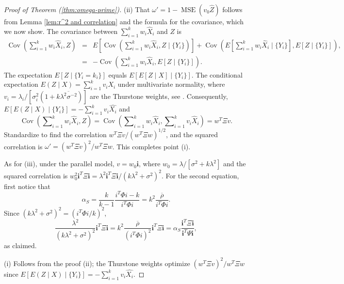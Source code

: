 \documentclass[twoside]{article}
\DeclareMathOperator{\Cov}{Cov}
\DeclareMathOperator{\MSE}{MSE}
\DeclareMathOperator{\tsum}{\textstyle \sum}
\renewcommand{\sqrt}[1]{{(#1)^{1/2}}}
\begin{document}
\begin{proof}[Proof of Theorem (\ref{thm:omega-prime})]
\label{proof:omega-prime}(ii) That $\omega'=1-\MSE(v_{0}\hat{Z})$
follows from Lemma \ref{lem:r^2 and correlation} and the formula
for the covariance, which we now show. The covariance between $\tsum_{i=1}^{k}w_{i}\hat{X}_{i}$
and $Z$ is
\begin{eqnarray*}
\Cov(\tsum_{i=1}^{k}w_{i}\hat{X}_{i},Z) & = & E[\Cov(\tsum_{i=1}^{k}w_{i}\hat{X}_{i},Z\mid\{Y_{i}\})]+\Cov(E[\tsum_{i=1}^{k}w_{i}\hat{X}_{i}\mid\{Y_{i}\}],E[Z\mid\{Y_{i}\}]),\\
 & = & -\Cov(\tsum_{i=1}^{k}w_{i}\hat{X}_{i},E[Z\mid\{Y_{i}\}]).
\end{eqnarray*}
The expectation $E[Z\mid\{Y_{i}=k_{i}\}]$ equals $E[E[Z\mid X]\mid\{Y_{i}\}]$.
The conditional expectation $E(Z\mid X)=\tsum_{i=1}^{k}v_{i}X_{i}$
under multivariate normality, where $v_{i}=\lambda_{i}/[\sigma_{i}^{2}(1+k\overline{\lambda^{2}\sigma^{-2}})]$
are the Thurstone weights, see \citet[Theorem 3.3.4]{Tong1990-lm}.
Consequently, $E[E(Z\mid X)\mid\{Y_{i}\}]=-\tsum_{i=1}^{k}v_{i}\hat{X_{i}}$
and 
\begin{equation*}
\Cov(\tsum_{i=1}^{k}w_{i}\hat{X}_{i},Z) =  \Cov(\tsum_{i=1}^{k}w_{i}\hat{X}_{i},\tsum_{i=1}^{k}v_{i}\hat{X}_{i})=w^{T}\Xi v.
\end{equation*}
Standardize to find the correlation $w^{T}\Xi v/\sqrt{w^{T}\Xi w}$,
and the squared correlation is $\omega'=(w^{T}\Xi v)^{2}/w^{T}\Xi w$.
This completes point (i). 

As for (iii), under the parallel model, $v=w_{0}\mathbf{i}$, where
$w_{0}=\lambda/[\sigma^{2}+k\lambda^{2}]$ and the squared correlation
is $w_{0}^{2}\mathbf{i}^{T}\Xi\mathbf{i}=\lambda^{2}\mathbf{i}^{T}\Xi\mathbf{i}/(k\lambda^{2}+\sigma^{2})^{2}$.
For the second equation, first notice that
\[
\alpha_S=\frac{k}{k-1}\frac{i^{T}\Phi i-k}{i^{T}\Phi i}=k^{2}\frac{\overline{\rho}}{i^{T}\Phi i}.
\]
Since $(k\lambda^{2}+\sigma^{2})^{2}=(i^{T}\Phi i/k)^{2}$, 
\begin{equation}
\frac{\lambda^{2}}{(k\lambda^{2}+\sigma^{2})^{2}}\mathbf{i}^{T}\Xi\mathbf{i} =  k^{2}\frac{\overline{\rho}}{(i^{T}\Phi i)^{2}}\mathbf{i}^{T}\Xi\mathbf{i} =  \alpha_S\frac{\mathbf{i}^{T}\Xi\mathbf{i}}{\mathbf{i}^{T}\Psi\mathbf{i}},\nonumber
\end{equation}
as claimed.

(i) Follows from the proof (ii); the Thurstone weights optimize $(w^{T}\Xi v)^{2}/w^{T}\Xi w$
since $E[E(Z\mid X)\mid\{Y_{i}\}]=-\tsum_{i=1}^{k}v_{i}\hat{X_{i}}$.
\end{proof}
\end{document}
